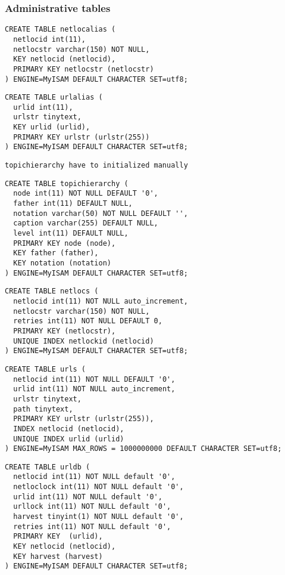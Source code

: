 \subsubsection{Administrative tables}
\begin{verbatim}
CREATE TABLE netlocalias (
  netlocid int(11),
  netlocstr varchar(150) NOT NULL,
  KEY netlocid (netlocid),
  PRIMARY KEY netlocstr (netlocstr)
) ENGINE=MyISAM DEFAULT CHARACTER SET=utf8;
\end{verbatim}

\begin{verbatim}
CREATE TABLE urlalias (
  urlid int(11),
  urlstr tinytext,
  KEY urlid (urlid),
  PRIMARY KEY urlstr (urlstr(255))
) ENGINE=MyISAM DEFAULT CHARACTER SET=utf8;
\end{verbatim}

\verb+topichierarchy have to initialized manually+\\
\begin{verbatim}
CREATE TABLE topichierarchy (
  node int(11) NOT NULL DEFAULT '0',
  father int(11) DEFAULT NULL,
  notation varchar(50) NOT NULL DEFAULT '',
  caption varchar(255) DEFAULT NULL,
  level int(11) DEFAULT NULL,
  PRIMARY KEY node (node),
  KEY father (father),
  KEY notation (notation)
) ENGINE=MyISAM DEFAULT CHARACTER SET=utf8;
\end{verbatim}

\begin{verbatim}
CREATE TABLE netlocs (
  netlocid int(11) NOT NULL auto_increment,
  netlocstr varchar(150) NOT NULL,
  retries int(11) NOT NULL DEFAULT 0,
  PRIMARY KEY (netlocstr),
  UNIQUE INDEX netlockid (netlocid)
) ENGINE=MyISAM DEFAULT CHARACTER SET=utf8;
\end{verbatim}

\begin{verbatim}
CREATE TABLE urls (
  netlocid int(11) NOT NULL DEFAULT '0',
  urlid int(11) NOT NULL auto_increment,
  urlstr tinytext,
  path tinytext,
  PRIMARY KEY urlstr (urlstr(255)),
  INDEX netlocid (netlocid),
  UNIQUE INDEX urlid (urlid)
) ENGINE=MyISAM MAX_ROWS = 1000000000 DEFAULT CHARACTER SET=utf8;
\end{verbatim}

\begin{verbatim}
CREATE TABLE urldb (
  netlocid int(11) NOT NULL default '0',
  netloclock int(11) NOT NULL default '0',
  urlid int(11) NOT NULL default '0',
  urllock int(11) NOT NULL default '0',
  harvest tinyint(1) NOT NULL default '0',
  retries int(11) NOT NULL default '0',
  PRIMARY KEY  (urlid),
  KEY netlocid (netlocid),
  KEY harvest (harvest)
) ENGINE=MyISAM DEFAULT CHARACTER SET=utf8;
\end{verbatim}

